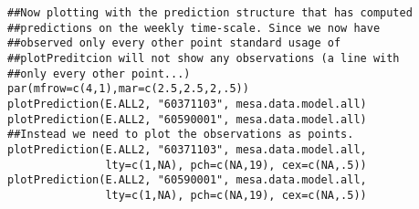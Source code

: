\begin{verbatim}
##Now plotting with the prediction structure that has computed 
##predictions on the weekly time-scale. Since we now have 
##observed only every other point standard usage of 
##plotPreditcion will not show any observations (a line with 
##only every other point...)
par(mfrow=c(4,1),mar=c(2.5,2.5,2,.5))
plotPrediction(E.ALL2, "60371103", mesa.data.model.all)
plotPrediction(E.ALL2, "60590001", mesa.data.model.all)
##Instead we need to plot the observations as points.
plotPrediction(E.ALL2, "60371103", mesa.data.model.all,
               lty=c(1,NA), pch=c(NA,19), cex=c(NA,.5))
plotPrediction(E.ALL2, "60590001", mesa.data.model.all,
               lty=c(1,NA), pch=c(NA,19), cex=c(NA,.5))
\end{verbatim}
